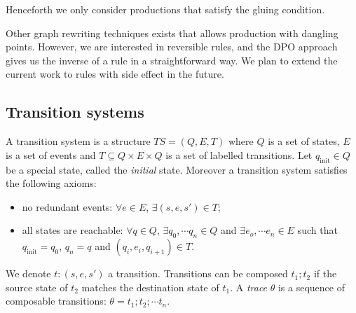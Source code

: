 Henceforth we only consider productions that satisfy the gluing condition.

\begin{remark}
Other graph rewriting techniques exists that allows production with dangling points. However, we are interested in reversible rules, and the DPO approach gives us the inverse of a rule in a straightforward way. We plan to extend the current work to rules with side effect in the future.
\end{remark}

\subsection{Transition systems}
\label{sec:ts}

\begin{definition}
  \label{def:ts_nielsen}
  A transition system is a structure $TS = (Q,E,T)$ where $Q$ is a set of states, $E$ is a set of events and $T\subseteq Q\times E\times Q$ is a set of labelled transitions. Let $q_{\text{init}}\in Q$ be a special state, called the \emph{initial} state. Moreover a transition system satisfies the following axioms:
  \begin{itemize}
  \item no redundant events: $\forall e\in E$, $\exists (s,e,s')\in T$;
  \item all states are reachable: $\forall q\in Q$, $\exists q_0,\cdots q_n \in Q$ and $\exists e_o,\cdots e_n\in E$ such that $q_{\text{init}} = q_0$, $q_n =q$ and $(q_i,e_i,q_{i+1}) \in T$.
  \end{itemize}
\end{definition}

We denote $t:(s,e,s')$ a transition. Transitions can be composed $t_1;t_2$ if the source state of $t_2$ matches the destination state of $t_1$. A \emph{trace} $\theta$ is a sequence of composable transitions: $\theta=t_1;t_2;\cdots t_n$.

